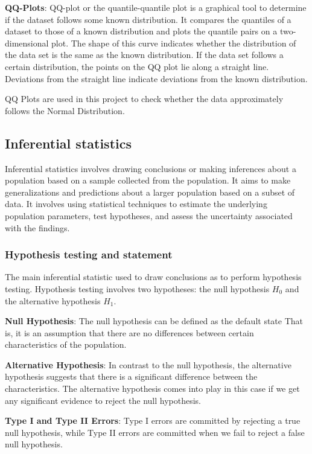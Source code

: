 \documentclass[fontsize=12 pt]{scrartcl}
\begin{document}
\textbf{QQ-Plots}: QQ-plot or the quantile-quantile plot is a graphical tool to determine if the dataset follows some known distribution. It compares the quantiles of a dataset to those of a known distribution and plots the quantile pairs on a two-dimensional plot. The shape of this curve indicates whether the distribution of the data set is the same as the known distribution. If the data set follows a certain distribution, the points on the QQ plot lie along a straight line. Deviations from the straight line indicate deviations from the known distribution.

QQ Plots are used in this project to check whether the data approximately follows the Normal Distribution. 


\subsection{Inferential statistics}

Inferential statistics involves drawing conclusions or making inferences about a population based on a sample collected from the population. It aims to make generalizations and predictions about a larger population based on a subset of data. It involves using statistical techniques to estimate the underlying population parameters, test hypotheses, and assess the uncertainty associated with the findings.

\subsubsection{Hypothesis testing and statement}
The main inferential statistic used to draw conclusions as to perform hypothesis testing. Hypothesis testing involves two hypotheses: the null
hypothesis $H_0$ and the alternative hypothesis $H_1$.

\textbf{Null Hypothesis}: The null hypothesis can be defined as the default state That is, it is an assumption that there are no differences between certain characteristics of the population. 

\textbf{Alternative Hypothesis}: In contrast to the null hypothesis, the alternative hypothesis suggests that there is a significant difference between the characteristics. The alternative hypothesis comes into play in this case if we get any significant evidence to reject the null hypothesis.

\textbf{Type I and Type II Errors}: Type I errors are committed by rejecting a true null hypothesis, while Type II errors are committed when we fail to reject a false null hypothesis.
\end{document}
